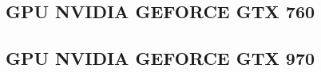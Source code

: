 \subsection{GPU NVIDIA GEFORCE GTX 760}









\newpage

\subsection{GPU NVIDIA GEFORCE GTX 970}










